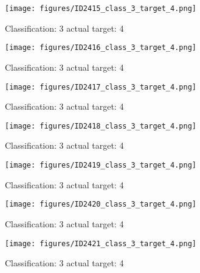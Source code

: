 \begin{figure}[h!]
\begin{center}
\texttt{[image: figures/ID2415\_class\_3\_target\_4.png]}
\end{center}
\caption{ Classification: 3 actual target: 4}
\label{fig:ID2415_class_3_target_4}
\end{figure}
\begin{figure}[h!]
\begin{center}
\texttt{[image: figures/ID2416\_class\_3\_target\_4.png]}
\end{center}
\caption{ Classification: 3 actual target: 4}
\label{fig:ID2416_class_3_target_4}
\end{figure}
\begin{figure}[h!]
\begin{center}
\texttt{[image: figures/ID2417\_class\_3\_target\_4.png]}
\end{center}
\caption{ Classification: 3 actual target: 4}
\label{fig:ID2417_class_3_target_4}
\end{figure}
\begin{figure}[h!]
\begin{center}
\texttt{[image: figures/ID2418\_class\_3\_target\_4.png]}
\end{center}
\caption{ Classification: 3 actual target: 4}
\label{fig:ID2418_class_3_target_4}
\end{figure}
\begin{figure}[h!]
\begin{center}
\texttt{[image: figures/ID2419\_class\_3\_target\_4.png]}
\end{center}
\caption{ Classification: 3 actual target: 4}
\label{fig:ID2419_class_3_target_4}
\end{figure}
\begin{figure}[h!]
\begin{center}
\texttt{[image: figures/ID2420\_class\_3\_target\_4.png]}
\end{center}
\caption{ Classification: 3 actual target: 4}
\label{fig:ID2420_class_3_target_4}
\end{figure}
\begin{figure}[h!]
\begin{center}
\texttt{[image: figures/ID2421\_class\_3\_target\_4.png]}
\end{center}
\caption{ Classification: 3 actual target: 4}
\label{fig:ID2421_class_3_target_4}
\end{figure}
